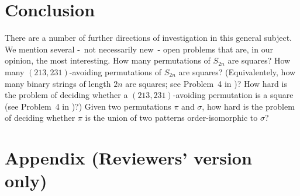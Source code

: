 \documentclass[a4paper]{llncs}
\begin{document}

\section{Conclusion}
\label{section:Conclusion}

There are a number of further directions of investigation in this general subject.
We mention several -~not necessarily new~- open problems that are, in our opinion,
the most interesting.
How many permutations of $S_{2n}$ are squares?
How many $(213,231)$-avoiding permutations of $S_{2n}$ are squares?
(Equivalentely, how many binary strings of length $2n$ are squares;
see Problem~4 in \cite{Henshall:Rampersad:Shallit:2011})?
How hard is the problem of deciding whether a $(213,231)$-avoiding permutation
is a square (see Problem~4 in \cite{Henshall:Rampersad:Shallit:2011})?)
Given two permutations $\pi$ and $\sigma$, how hard is the problem of deciding
whether $\pi$ is the union of two patterns order-isomorphic to $\sigma$?







\newpage
\section*{Appendix (Reviewers' version only)}


\end{document}
